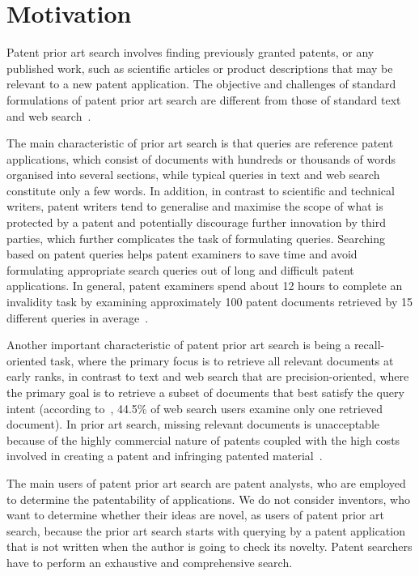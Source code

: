 \section{Motivation}
\label{sec:Motivation}
Patent prior art search involves finding previously granted patents,
or any published work, such as scientific articles or product
descriptions that may be relevant to a new patent application. 
The objective and challenges of standard formulations of patent prior art
search are different from those of standard text and web search~\citep{magdy2012toward}.

The main characteristic of prior art search is that queries are reference patent
applications, which consist of documents with hundreds or thousands of
words organised into several sections, while typical queries in text
and web search constitute only a few words. 
In addition, in contrast to scientific and technical writers, patent writers
tend to generalise and maximise the scope of what is protected by a
patent and potentially discourage further innovation by third parties,
which further complicates the task of formulating queries. 
Searching based on patent queries helps patent examiners to save time and avoid 
formulating appropriate search queries out of long and difficult patent applications. In general, patent
examiners spend about 12 hours to complete an invalidity task by examining
approximately 100 patent documents retrieved by 15 different queries in average~\citep{joho2010survey}.

Another important characteristic of patent prior art
search is being a recall-oriented task, where the primary focus is to
retrieve all relevant documents at early ranks, in contrast to text
and web search that are precision-oriented, where the primary goal is
to retrieve a subset of documents that best satisfy the query
intent (according to~\citep{zhang2010search}, 44.5\% of web search users examine only one retrieved document). 
In prior art search, missing relevant documents is unacceptable because of the highly commercial nature of patents coupled with the high costs involved
in creating a patent and infringing patented material~\citep{joho2010survey}.

The main users of patent prior art search are 
patent analysts, who are employed to determine the patentability 
of applications. We do not consider inventors, who want to determine whether their ideas are novel, as users of patent prior art search, because the prior art search starts with querying by a patent application that is not written when the author is going to check its novelty.
Patent searchers have to perform an exhaustive and comprehensive search.

